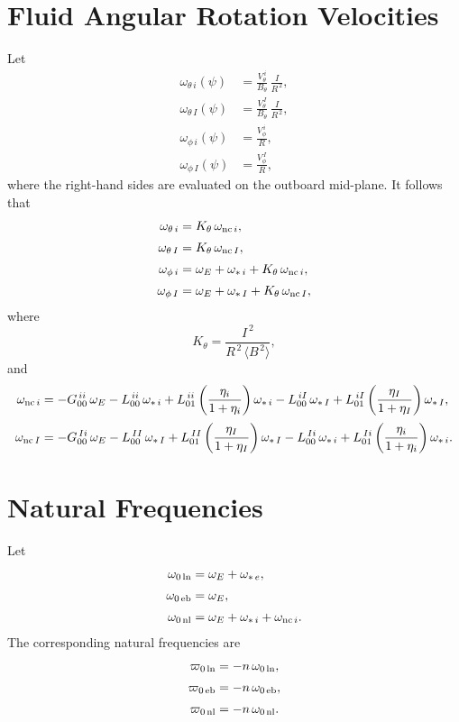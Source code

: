 \documentclass[12pt]{article}
\begin{document}
\section{Fluid Angular Rotation Velocities}
Let
\begin{align}
\omega_{\theta\,i}(\psi)&=\frac{V_\theta^{\,i}}{B_\theta}\,\frac{I}{R^{\,2}},\\[0.5ex]
\omega_{\theta\,I}(\psi)&=\frac{V_\theta^{\,I}}{B_\theta}\,\frac{I}{R^{\,2}},\\[0.5ex]
\omega_{\phi\,i}(\psi) &= \frac{V_\phi^{\,i}}{R},\\[0.5ex]
\omega_{\phi\,I}(\psi) &= \frac{V_\phi^{\,I}}{R},
\end{align}
where the right-hand sides are evaluated on the outboard mid-plane.
It follows that
\begin{align}
\omega_{\theta\,i}&= K_\theta\,\omega_{{\rm nc}\,i},\\[0.5ex]
\omega_{\theta\,I} &= K_\theta\,\omega_{{\rm nc}\,I},\\[0.5ex]
\omega_{\phi\,i} &= \omega_E+\omega_{\ast\,i} +K_\theta\, \omega_{{\rm nc}\,i},\\[0.5ex]
\omega_{\phi\,I} &= \omega_E+\omega_{\ast\,I} + K_\theta\,\omega_{{\rm nc}\,I},
\end{align}
where
\begin{equation}
K_\theta = \frac{I^{\,2}}{R^{\,2}\,\langle B^{\,2}\rangle},
\end{equation}
and 
\begin{align}
\omega_{{\rm nc}\,i}&= -G^{\,ii}_{00}\,\omega_E-L^{\,ii}_{00}\,\omega_{\ast\,i}+L^{\,ii}_{01}\left(\frac{\eta_i}{1+\eta_i}\right)\omega_{\ast\,i}-
L^{\,iI}_{00}\,\omega_{\ast\,I}+L^{\,iI}_{01}\left(\frac{\eta_I}{1+\eta_I}\right)\omega_{\ast\,I},\\[0.5ex]
\omega_{{\rm nc}\,I}&= -G^{\,Ii}_{00}\,\omega_E-L^{\,II}_{00}\,\omega_{\ast\,I}+L^{\,II}_{01}\left(\frac{\eta_I}{1+\eta_I}\right)\omega_{\ast\,I}-
L^{\,Ii}_{00}\,\omega_{\ast\,i}+L^{\,Ii}_{01}\left(\frac{\eta_i}{1+\eta_i}\right)\omega_{\ast\,i}.
\end{align}

\section{Natural Frequencies}
Let
\begin{align}
\omega_{0\,{\rm ln}} &=\omega_E+\omega_{\ast\,e},\\[0.5ex]
\omega_{0\,{\rm eb}} &= \omega_E,\\[0.5ex]
\omega_{0\,{\rm nl}} &=\omega_E+\omega_{\ast\,i}+ \omega_{{\rm nc}\,i}.
\end{align}
The corresponding natural frequencies are
\begin{align}
\varpi_{0\,{\rm ln}} &=-n\,\omega_{0\,{\rm ln}} ,\\[0.5ex]
\varpi_{0\,{\rm eb}} &= -n\,\omega_{0\,{\rm eb}} ,\\[0.5ex]
\varpi_{0\,{\rm nl}} &=-n\,\omega_{0\,{\rm nl}} .
\end{align}
\end{document}
